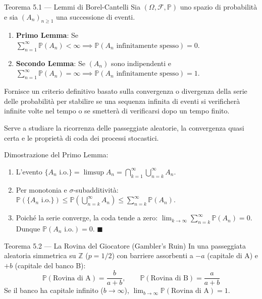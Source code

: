\documentclass[11pt,a4paper]{report}
\newcommand{\PP}{\mathbb{P}}
\newcommand{\F}{\mathcal{F}}
\newcommand{\1}{\mathbf{1}}
\begin{document}
\begin{teoremabox}{Teorema 5.1 --- Lemmi di Borel-Cantelli}
Sia $(\Omega, \F, \PP)$ uno spazio di probabilità e sia $(A_n)_{n \ge 1}$ una successione di eventi.
\begin{enumerate}
    \item \textbf{Primo Lemma}: Se $\sum_{n=1}^\infty \PP(A_n) < \infty \implies \PP(A_n \text{ infinitamente spesso}) = 0$.
    \item \textbf{Secondo Lemma}: Se $(A_n)$ sono indipendenti e $\sum_{n=1}^\infty \PP(A_n) = \infty \implies \PP(A_n \text{ infinitamente spesso}) = 1$.
\end{enumerate}
\end{teoremabox}

\begin{cosafa}
Fornisce un criterio definitivo basato sulla convergenza o divergenza della serie delle probabilità per stabilire se una sequenza infinita di eventi si verificherà infinite volte nel tempo o se smetterà di verificarsi dopo un tempo finito.
\end{cosafa}

\begin{acosaserve}
Serve a studiare la ricorrenza delle passeggiate aleatorie, la convergenza quasi certa e le proprietà di coda dei processi stocastici.
\end{acosaserve}

\begin{dimostrazione}
Dimostrazione del Primo Lemma:
\begin{enumerate}
    \item L'evento $\{A_n \text{ i.o.}\} = \limsup A_n = \bigcap_{k=1}^\infty \bigcup_{n=k}^\infty A_n$.
    \item Per monotonia e $\sigma$-subadditività: $\PP(\{A_n \text{ i.o.}\}) \le \PP(\bigcup_{n=k}^\infty A_n) \le \sum_{n=k}^\infty \PP(A_n)$.
    \item Poiché la serie converge, la coda tende a zero: $\lim_{k \to \infty} \sum_{n=k}^\infty \PP(A_n) = 0$. Dunque $\PP(A_n \text{ i.o.}) = 0$. $\blacksquare$
\end{enumerate}
\end{dimostrazione}

\vspace{0.4cm}

\begin{teoremabox}{Teorema 5.2 --- La Rovina del Giocatore (Gambler's Ruin)}
In una passeggiata aleatoria simmetrica su $\mathbb{Z}$ ($p=1/2$) con barriere assorbenti a $-a$ (capitale di A) e $+b$ (capitale del banco B):
\[ \PP(\text{Rovina di A}) = \frac{b}{a+b}, \qquad \PP(\text{Rovina di B}) = \frac{a}{a+b} \]
Se il banco ha capitale infinito ($b \to \infty$), $\lim_{b \to \infty} \PP(\text{Rovina di A}) = 1$.
\end{teoremabox}
\end{document}
